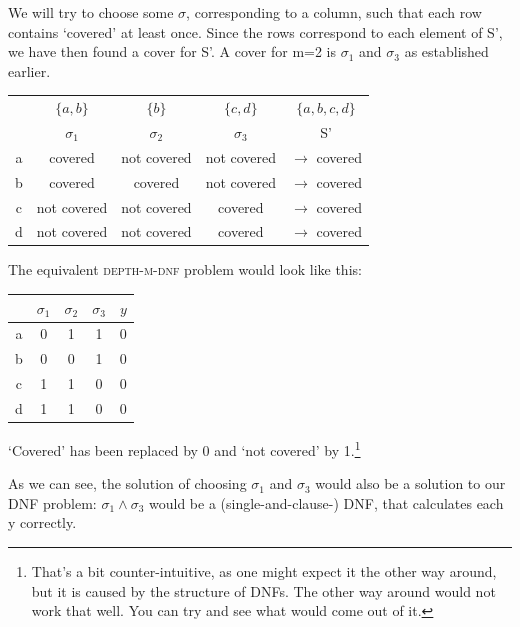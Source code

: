 \documentclass{article}
\begin{document}
We will try to choose some $\sigma$, corresponding to a column, such that each row contains `covered' at least once. Since the rows correspond to each element of S', we have then found a cover for S'. A cover for m=2 is $\sigma_1$ and $\sigma_3$ as established earlier.


\begin{center}
    \begin{tabular}{c || c c c | c}
          & $\{a, b\}$ & $\{b\}$ & $\{c, d\}$ & $\{a, b, c, d\}$ \\
          & \cellcolor{blue!25}$\sigma_1$ & $\sigma_2$ & \cellcolor{blue!25}$\sigma_3$ & S' \\
        \hline
        \hline
        \cellcolor{blue!25}a & \cellcolor{blue!25}covered & not covered & \cellcolor{blue!10}not covered & $\rightarrow$ covered \\
        \cellcolor{blue!25}b & \cellcolor{blue!25}covered & covered & \cellcolor{blue!10}not covered & $\rightarrow$ covered \\
        \cellcolor{blue!25}c & \cellcolor{blue!10}not covered & not covered & \cellcolor{blue!25}covered & $\rightarrow$ covered \\
        \cellcolor{blue!25}d & \cellcolor{blue!10}not covered & not covered & \cellcolor{blue!25}covered & $\rightarrow$ covered
    \end{tabular}
\end{center}

The equivalent \textsc{depth-m-dnf} problem would look like this:

\begin{center}
    \begin{tabular}{c || c c c | c}
        & $\sigma_1$ & $\sigma_2$ & $\sigma_3$ & $y$ \\
        \hline
        \hline
        a & 0 & 1 & 1 & 0 \\
        b & 0 & 0 & 1 & 0 \\
        c & 1 & 1 & 0 & 0 \\
        d & 1 & 1 & 0 & 0
    \end{tabular}
\end{center}


`Covered' has been replaced by 0 and `not covered' by 1.\footnote{That's a bit counter-intuitive, as one might expect it the other way around, but it is caused by the structure of DNFs. The other way around would not work that well. You can try and see what would come out of it.}

As we can see, the solution of choosing $\sigma_1$ and $\sigma_3$ would also be a solution to our DNF problem: $\sigma_1 \land \sigma_3$ would be a (single-and-clause-) DNF, that calculates each y correctly.
\end{document}
